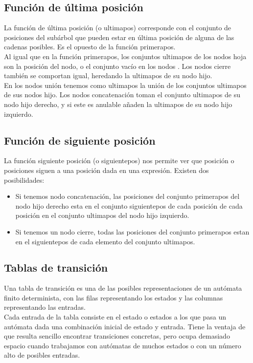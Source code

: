 \subsection{Función de última posición}
La función de última posición (o ultimapos) corresponde con el conjunto de posiciones del subárbol que pueden estar en última posición de alguna de las cadenas posibles.
Es el opuesto de la función primerapos.
\\
Al igual que en la función primerapos, los conjuntos ultimapos de los nodos hoja son la posición del nodo, o el conjunto vacío en los nodos \epsilon.
Los nodos cierre también se comportan igual, heredando la ultimapos de su nodo hijo.
\\
En los nodos unión tenemos como ultimapos la unión de los conjuntos ultimapos de sus nodos hijo.
Los nodos concatenación toman el conjunto ultimapos de su nodo hijo derecho, y si este es anulable añaden la ultimapos de su nodo hijo izquierdo.

\subsection{Función de siguiente posición}
La función siguiente posición (o siguientepos) nos permite ver que posición o posiciones siguen a una posición dada en una expresión.
Existen dos posibilidades:
\begin{itemize}
	\item Si tenemos nodo concatenación, las posiciones del conjunto primerapos del nodo hijo derecho esta en el conjunto siguientepos de cada posición de cada posición en el conjunto ultimapos del nodo hijo izquierdo.
	\item Si tenemos un nodo cierre, todas las posiciones del conjunto primerapos estan en el siguientepos de cada elemento del conjunto ultimapos.
\end{itemize}

\subsection{Tablas de transición}
Una tabla de transición es una de las posibles representaciones de un autómata finito determinista, con las filas representando los estados y las columnas representando las entradas.
\\
Cada entrada de la tabla consiste en el estado o estados a los que pasa un autómata dada una combinación inicial de estado y entrada.
Tiene la ventaja de que resulta sencillo encontrar transiciones concretas, pero ocupa demasiado espacio cuando trabajamos con autómatas de muchos estados o con un número alto de posibles entradas.
